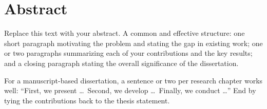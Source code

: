 

\chapter{Abstract}

Replace this text with your abstract.  A common and effective
structure: one short paragraph motivating the problem and stating the
gap in existing work; one or two paragraphs summarizing each of your
contributions and the key results; and a closing paragraph stating the
overall significance of the dissertation.

For a manuscript-based dissertation, a sentence or two per research
chapter works well: ``First, we present \ldots\ Second, we develop
\ldots\ Finally, we conduct \ldots''  End by tying the contributions
back to the thesis statement.

